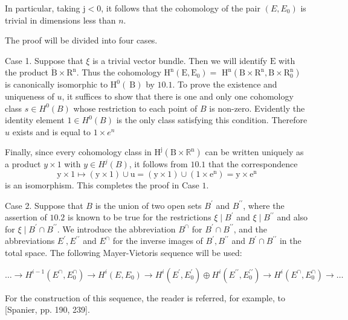 \documentclass[10pt]{article}
\begin{document}
In particular, taking $\mathrm{j}<0$, it follows that the cohomology of the pair $\left(E, E_{0}\right)$ is trivial in dimensions less than $n$.

The proof will be divided into four cases.

Case 1. Suppose that $\xi$ is a trivial vector bundle. Then we will identify $\mathrm{E}$ with the product $\dot{\mathrm{B}} \times \mathrm{R}^{\mathrm{n}}$. Thus the cohomology $\mathrm{H}^{\mathrm{n}}\left(\mathrm{E}, \mathrm{E}_{0}\right)=$ $\mathrm{H}^{\mathrm{n}}\left(\mathrm{B} \times \mathrm{R}^{\mathrm{n}}, \mathrm{B} \times \mathrm{R}_{0}^{\mathrm{n}}\right)$ is canonically isomorphic to $\mathrm{H}^{0}(\mathrm{~B})$ by $10.1$. To prove the existence and uniqueness of $u$, it suffices to show that there is one and only one cohomology class $s \in H^{0}(B)$ whose restriction to each point of $B$ is non-zero. Evidently the identity element $1 \in H^{0}(B)$ is the only class satisfying this condition. Therefore $u$ exists and is equal to $1 \times e^{n}$

Finally, since every cohomology class in $\mathrm{H}^{\mathrm{j}}\left(\mathrm{B} \times \mathbb{R}^{\mathrm{n}}\right)$ can be written uniquely as a product $y \times 1$ with $y \in H^{j}(B)$, it follows from $10.1$ that the correspondence
$$
\mathrm{y} \times 1 \mapsto(\mathrm{y} \times 1) \cup \mathrm{u}=(\mathrm{y} \times 1) \cup\left(1 \times \mathrm{e}^{\mathrm{n}}\right)=\mathrm{y} \times \mathrm{e}^{\mathrm{n}}
$$
is an isomorphism. This completes the proof in Case $1 .$

Case 2. Suppose that $B$ is the union of two open sets $B^{\prime}$ and $B^{\prime \prime}$, where the assertion of $10.2$ is known to be true for the restrictions $\xi \mid B^{\prime}$ and $\xi \mid B^{\prime \prime}$ and also for $\xi \mid B^{\prime} \cap B^{\prime \prime}$. We introduce the abbreviation $B^{\cap}$ for $B^{\prime} \cap B^{\prime \prime}$, and the abbreviations $E^{\prime}, E^{\prime \prime}$ and $E^{\cap}$ for the inverse images of $B^{\prime}, B^{\prime \prime}$ and $B^{\prime} \cap B^{\prime \prime}$ in the total space. The following Mayer-Vietoris sequence will be used:

$\ldots \rightarrow H^{i-1}\left(E^{\cap}, E_{0}^{\cap}\right) \rightarrow H^{i}\left(E, E_{0}\right) \rightarrow H^{i}\left(E^{\prime}, E_{0}^{\prime}\right) \oplus H^{i}\left(E^{\prime \prime}, E_{0}^{\prime \prime}\right) \rightarrow H^{i}\left(E^{\cap}, E_{0}^{\cap}\right) \rightarrow \ldots$

For the construction of this sequence, the reader is referred, for example, to [Spanier, pp. 190, 239].
\end{document}

